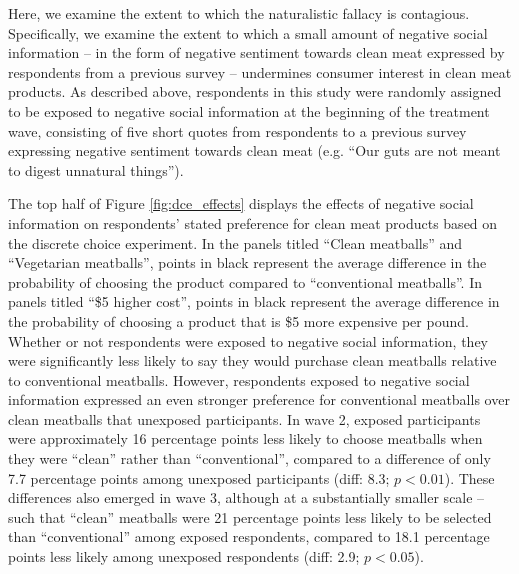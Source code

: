 \documentclass[12pt]{article}
\begin{document}
Here, we examine the extent to which the naturalistic fallacy is contagious. Specifically, we examine the extent to which a small amount of negative social information -- in the form of negative sentiment towards clean meat expressed by respondents from a previous survey -- undermines consumer interest in clean meat products. As described above, respondents in this study were randomly assigned to be exposed to negative social information at the beginning of the treatment wave, consisting of five short quotes from respondents to a previous survey expressing negative sentiment towards clean meat (e.g. ``Our guts are not meant to digest unnatural things'').

The top half of Figure \ref{fig:dce_effects} displays the effects of negative social information on respondents' stated preference for clean meat products based on the discrete choice experiment. In the panels titled ``Clean meatballs'' and ``Vegetarian meatballs'', points in black represent the average difference in the probability of choosing the product compared to ``conventional meatballs''. In panels titled ``\$5 higher cost'', points in black represent the average difference in the probability of choosing a product that is \$5 more expensive per pound. Whether or not respondents were exposed to negative social information, they were significantly less likely to say they would purchase clean meatballs relative to conventional meatballs. However, respondents exposed to negative social information expressed an even stronger preference for conventional meatballs over clean meatballs that unexposed participants. In wave 2, exposed participants were approximately 16 percentage points less likely to choose meatballs when they were ``clean'' rather than ``conventional'', compared to a difference of only 7.7 percentage points among unexposed participants (diff: 8.3; $p < 0.01$). These differences also emerged in wave 3, although at a substantially smaller scale -- such that ``clean'' meatballs were 21 percentage points less likely to be selected than ``conventional'' among exposed respondents, compared to 18.1 percentage points less likely among unexposed respondents (diff: 2.9; $p < 0.05$).

\end{document}
